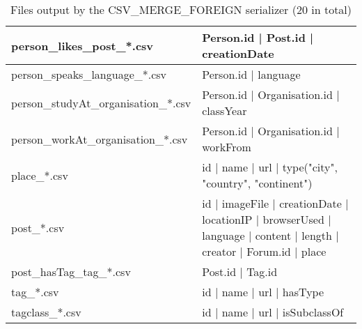 \begin{table}[htb]
{\begin{tabular}{|p{4.3cm}|p{12.4cm}|}
    	person\_likes\_post\_*.csv           & Person.id | Post.id | creationDate                                                                                  \\ \hline
    	person\_speaks\_language\_*.csv      & Person.id | language                                                                                                \\ \hline
    	person\_studyAt\_organisation\_*.csv & Person.id | Organisation.id | classYear                                                                             \\ \hline
    	person\_workAt\_organisation\_*.csv  & Person.id | Organisation.id | workFrom                                                                              \\ \hline
    	place\_*.csv                         & id | name | url | type({"city", "country", "continent"})                                                            \\ \hline
    	post\_*.csv                          & id | imageFile | creationDate | locationIP | browserUsed | language | content | length | creator | Forum.id | place \\ \hline
    	post\_hasTag\_tag\_*.csv             & Post.id | Tag.id                                                                                                    \\ \hline
    	tag\_*.csv                           & id | name | url | hasType                                                                                           \\ \hline
    	tagclass\_*.csv                      & id | name | url | isSubclassOf                                                                                      \\ \hline
    \end{tabular}}
    \caption{Files output by the CSV\_MERGE\_FOREIGN serializer (20 in total)}
    \label{table:csv_merge_foreign}
\end{table}
